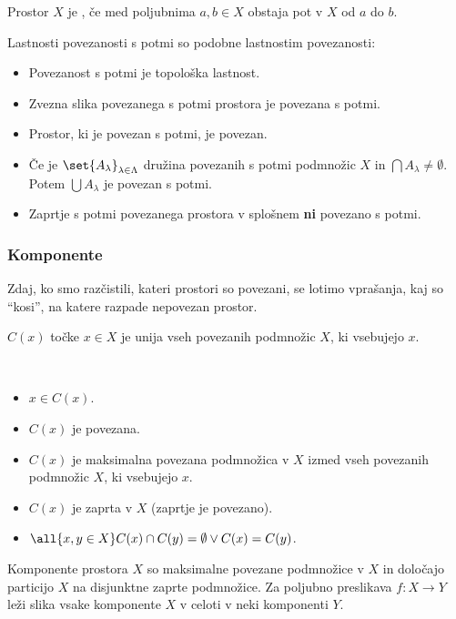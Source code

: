 \begin{definicija}
    Prostor $X$ je , če med poljubnima $a, b \in X$ obstaja pot v $X$ od $a$ do $b$.
\end{definicija}

Lastnosti povezanosti s potmi so podobne lastnostim povezanosti:
\begin{itemize}
    \item Povezanost s potmi je topološka lastnost.
    \item Zvezna slika povezanega s potmi prostora je povezana s potmi.
    \item Prostor, ki je povezan s potmi, je povezan.
    \item Če je $\set{A_\lambda}_{\lambda \in \Lambda}$ družina povezanih s potmi podmnožic $X$ in $\bigcap A_\lambda \neq \emptyset$. Potem $\bigcup A_\lambda$ je povezan s potmi.
    \item Zaprtje s potmi povezanega prostora v splošnem \textbf{ni} povezano s potmi.
\end{itemize}

\newpage
\subsubsection{Komponente}
Zdaj, ko smo razčistili, kateri prostori so povezani, se lotimo vprašanja, kaj so "`kosi"', na katere razpade nepovezan prostor.

\begin{definicija}
     $C(x)$ točke $x \in X$ je unija vseh povezanih podmnožic $X$, ki vsebujejo $x$.
\end{definicija}
\begin{opomba}
    \ 
    \begin{itemize}
        \item $x \in C(x)$.
        \item $C(x)$ je povezana.
        \item $C(x)$ je maksimalna povezana podmnožica v $X$ izmed vseh povezanih podmnožic $X$, ki vsebujejo $x$.
        \item $C(x)$ je zaprta v $X$ (zaprtje je povezano).
        \item $\all{x, y \in X} C(x) \cap C(y) = \emptyset \lor C(x) = C(y)$.
    \end{itemize}
\end{opomba}

\begin{izrek}
    Komponente prostora $X$ so maksimalne povezane podmnožice v $X$ in določajo particijo $X$ na disjunktne zaprte podmnožice. Za poljubno preslikava $f: X \to Y$ leži slika vsake komponente $X$ v celoti v neki komponenti $Y$.
\end{izrek}

